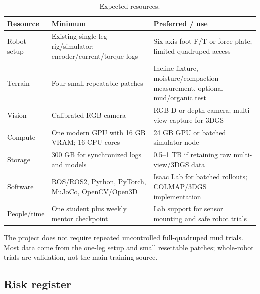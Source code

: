 \begin{table}[ht]
\centering
\caption{Expected resources.}
\label{tab:resources}
\begin{tabularx}{\textwidth}{@{}L{31mm}Y Y@{}}
\toprule
\textbf{Resource} & \textbf{Minimum} & \textbf{Preferred / use}\\
\midrule
Robot setup & Existing single-leg rig/simulator; encoder/current/torque logs & Six-axis foot F/T or force plate; limited quadruped access\\
Terrain & Four small repeatable patches & Incline fixture, moisture/compaction measurement, optional mud/organic test\\
Vision & Calibrated RGB camera & RGB-D or depth camera; multi-view capture for 3DGS\\
Compute & One modern GPU with 16 GB VRAM; 16 CPU cores & 24 GB GPU or batched simulator node\\
Storage & 300 GB for synchronized logs and models & 0.5--1 TB if retaining raw multi-view/3DGS data\\
Software & ROS/ROS2, Python, PyTorch, MuJoCo, OpenCV/Open3D & Isaac Lab for batched rollouts; COLMAP/3DGS implementation\\
People/time & One student plus weekly mentor checkpoint & Lab support for sensor mounting and safe robot trials\\
\bottomrule
\end{tabularx}
\end{table}

The project does not require repeated uncontrolled full-quadruped mud trials. Most data come from the one-leg setup and small resettable patches; whole-robot trials are validation, not the main training source.

\subsection{Risk register}

